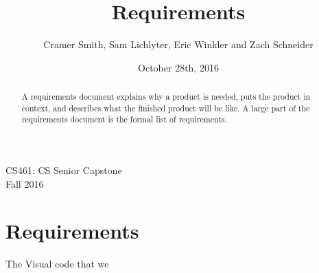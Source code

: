 \documentclass[letterpaper,10pt,titlepage,draftclsnofoot,onecolumn] {IEEEtran}
\title{Requirements}
\author{Cramer Smith, Sam Lichlyter, Eric Winkler and Zach Schneider}
\date{October 28th, 2016}
\begin{document}
\begin{titlepage}

\maketitle
\begin{center}
CS461: CS Senior Capstone \\
Fall 2016

\begin{abstract}

A requirements document explains why a product is needed, puts the product in context, and describes what the finished product will be like. A large part of the requirements document is the formal list of requirements.

\end{abstract}

\end{center}

\end{titlepage}

\section{Requirements}

The Visual code that we 
\end{document}
